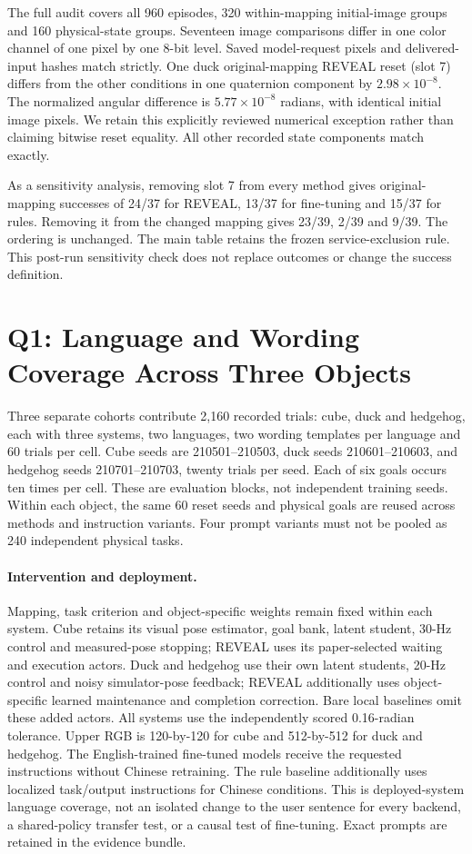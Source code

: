 The full audit covers all 960 episodes, 320 within-mapping initial-image groups and 160 physical-state groups. Seventeen image comparisons differ in one color channel of one pixel by one 8-bit level. Saved model-request pixels and delivered-input hashes match strictly. One duck original-mapping REVEAL reset (slot 7) differs from the other conditions in one quaternion component by $2.98\times10^{-8}$. The normalized angular difference is $5.77\times10^{-8}$ radians, with identical initial image pixels. We retain this explicitly reviewed numerical exception rather than claiming bitwise reset equality. All other recorded state components match exactly.

As a sensitivity analysis, removing slot 7 from every method gives original-mapping successes of 24/37 for REVEAL, 13/37 for fine-tuning and 15/37 for rules. Removing it from the changed mapping gives 23/39, 2/39 and 9/39. The ordering is unchanged. The main table retains the frozen service-exclusion rule. This post-run sensitivity check does not replace outcomes or change the success definition.

\section{Q1: Language and Wording Coverage Across Three Objects}
\label{sec:language-supp}
Three separate cohorts contribute 2,160 recorded trials: cube, duck and hedgehog, each with three systems, two languages, two wording templates per language and 60 trials per cell. Cube seeds are 210501--210503, duck seeds 210601--210603, and hedgehog seeds 210701--210703, twenty trials per seed. Each of six goals occurs ten times per cell. These are evaluation blocks, not independent training seeds. Within each object, the same 60 reset seeds and physical goals are reused across methods and instruction variants. Four prompt variants must not be pooled as 240 independent physical tasks.

\paragraph{Intervention and deployment.}
Mapping, task criterion and object-specific weights remain fixed within each system. Cube retains its visual pose estimator, goal bank, latent student, 30-Hz control and measured-pose stopping; REVEAL uses its paper-selected waiting and execution actors. Duck and hedgehog use their own latent students, 20-Hz control and noisy simulator-pose feedback; REVEAL additionally uses object-specific learned maintenance and completion correction. Bare local baselines omit these added actors. All systems use the independently scored 0.16-radian tolerance. Upper RGB is 120-by-120 for cube and 512-by-512 for duck and hedgehog. The English-trained fine-tuned models receive the requested instructions without Chinese retraining. The rule baseline additionally uses localized task/output instructions for Chinese conditions. This is deployed-system language coverage, not an isolated change to the user sentence for every backend, a shared-policy transfer test, or a causal test of fine-tuning. Exact prompts are retained in the evidence bundle.

